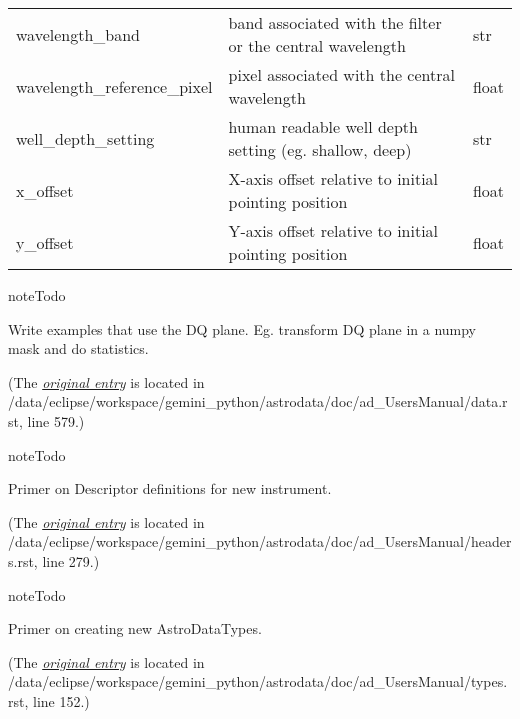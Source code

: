 \documentclass[letterpaper,10pt,english]{sphinxmanual}
\begin{document}
\begin{longtable}{|l|p{3.0in}|l|}
wavelength\_band
 & 
band associated with the filter or the central wavelength
 & 
str
\\

wavelength\_reference\_pixel
 & 
pixel associated with the central wavelength
 & 
float
\\

well\_depth\_setting
 & 
human readable well depth setting (eg. shallow, deep)
 & 
str
\\

x\_offset
 & 
X-axis offset relative to initial pointing position
 & 
float
\\

y\_offset
 & 
Y-axis offset relative to initial pointing position
 & 
float
\\
\hline\end{longtable}


\begin{notice}{note}{Todo}

Write examples that use the DQ plane.  Eg. transform DQ plane in a numpy
mask and do statistics.
\end{notice}

(The {\hyperref[data:index-0]{\emph{original entry}}} is located in  /data/eclipse/workspace/gemini\_python/astrodata/doc/ad\_UsersManual/data.rst, line 579.)

\begin{notice}{note}{Todo}

Primer on Descriptor definitions for new instrument.
\end{notice}

(The {\hyperref[headers:index-0]{\emph{original entry}}} is located in  /data/eclipse/workspace/gemini\_python/astrodata/doc/ad\_UsersManual/headers.rst, line 279.)

\begin{notice}{note}{Todo}

Primer on creating new AstroDataTypes.
\end{notice}

(The {\hyperref[types:index-0]{\emph{original entry}}} is located in  /data/eclipse/workspace/gemini\_python/astrodata/doc/ad\_UsersManual/types.rst, line 152.)



\renewcommand{\indexname}{Index}
\printindex
\end{document}
